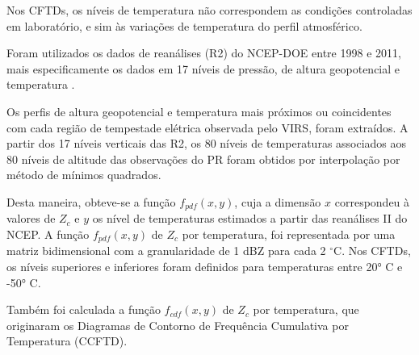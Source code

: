 Nos CFTDs, os níveis de temperatura não correspondem as condições controladas em laboratório, e sim às variações de temperatura do perfil atmosférico. 

Foram utilizados os dados de reanálises (R2) do NCEP-DOE  entre 1998 e 2011, mais especificamente os dados em 17 níveis de pressão, de altura geopotencial e temperatura \cite{kanamitsu}. 

Os perfis de altura geopotencial e temperatura mais próximos ou coincidentes com cada região de tempestade elétrica observada pelo VIRS, foram extraídos. A partir dos 17 níveis verticais das R2, os 80 níveis de temperaturas associados aos 80 níveis de altitude das observações do PR foram obtidos por interpolação por método de mínimos quadrados.

Desta maneira, obteve-se a função $f_{pdf}(x,y)$, cuja a dimensão $x$ correspondeu à valores de $Z_{c}$ e $y$ os nível de temperaturas estimados a partir das reanálises II do NCEP. A função $f_{pdf}(x,y)$ de $Z_c$ por temperatura, foi representada por uma matriz bidimensional com a granularidade de 1 dBZ para cada 2 $^{\circ}$C. Nos CFTDs, os níveis superiores e inferiores foram definidos para temperaturas entre 20° C e -50° C.


Também foi calculada a função $f_{cdf}(x,y)$ de $Z_c$ por temperatura, que originaram os Diagramas de Contorno de Frequência Cumulativa por Temperatura (CCFTD).     







